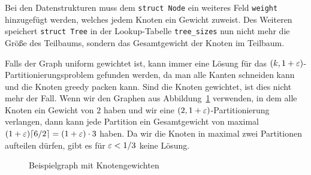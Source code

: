 Bei den Datenstrukturen muss dem \texttt{struct Node} ein weiteres Feld \texttt{weight} hinzugefügt werden, welches jedem Knoten ein Gewicht zuweist.
Des Weiteren speichert \texttt{struct Tree} in der Lookup-Tabelle \texttt{tree\_sizes} nun nicht mehr die Größe des Teilbaums, sondern das Gesamtgewicht der Knoten im Teilbaum.

\begin{rem}
    Falls der Graph uniform gewichtet ist, kann immer eine Lösung für das $(k,1+\varepsilon)$\hyp Partitionierungsproblem gefunden werden, da man alle Kanten schneiden kann und die Knoten greedy packen kann.
    Sind die Knoten gewichtet, ist dies nicht mehr der Fall.
    Wenn wir den Graphen aus Abbildung~\ref{fig:graph} verwenden, in dem alle Knoten ein Gewicht von $2$ haben und wir eine $(2, 1 + \varepsilon)$\hyp Partitionierung verlangen, dann kann jede Partition ein Gesamtgewicht von maximal $(1 + \varepsilon) \lceil6/2\rceil = (1 + \varepsilon) \cdot 3$ haben.
    Da wir die Knoten in maximal zwei Partitionen aufteilen dürfen, gibt es für $\varepsilon < 1/3$ keine Lösung.
\end{rem}

\begin{figure}[b]
    \centering
    \caption{Beispielgraph mit Knotengewichten\label{fig:graph}}
\end{figure}

